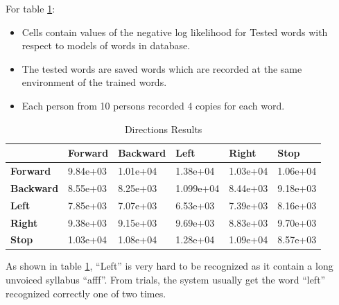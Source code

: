 \documentclass[12pt, a4paper, twoside]{report}
\begin{document}
For table \ref{tab:gmm-directions}:
\begin{itemize}[noitemsep]
\item Cells contain values of the negative log likelihood for Tested words with respect to models of words in database.
\item The tested words are saved words which are recorded at the same environment of the trained words.
\item Each person from 10 persons recorded 4 copies for each word.
\end{itemize}
\begin{table}[!h]
\centering
\begin{tabular}{|l|l|l|l|l|l|}
\hline
   & \textbf{Forward}                 & \textbf{Backward}                & \textbf{Left}                    & \textbf{Right}                   & \textbf{Stop}                    \\ \hline
\textbf{Forward}  & \cellcolor[HTML]{D4D4D4}9.84e+03 & 1.01e+04                         & 1.38e+04                         & 1.03e+04                         & 1.06e+04                         \\ \hline
\textbf{Backward} & 8.55e+03                         & \cellcolor[HTML]{D4D4D4}8.25e+03 & 1.099e+04                         & 8.44e+03                         & 9.18e+03                         \\ \hline
\textbf{Left}     & 7.85e+03                         & 7.07e+03                         & \cellcolor[HTML]{D4D4D4}6.53e+03 & 7.39e+03                         & 8.16e+03                         \\ \hline
\textbf{Right}    & 9.38e+03                         & 9.15e+03                         & 9.69e+03                         & \cellcolor[HTML]{D4D4D4}8.83e+03 & 9.70e+03                         \\ \hline
\textbf{Stop}     & 1.03e+04                         & 1.08e+04                         & 1.28e+04                         & 1.09e+04                         & \cellcolor[HTML]{D4D4D4}8.57e+03 \\ \hline
\end{tabular}
\caption{Directions Results}
\label{tab:gmm-directions}
\end{table}
As shown in table \ref{tab:gmm-directions}, ``Left'' is very hard to be recognized as it contain a long unvoiced syllabus ``afff''. From trials, the system usually get the word ``left'' recognized correctly one of two times.
\end{document}
